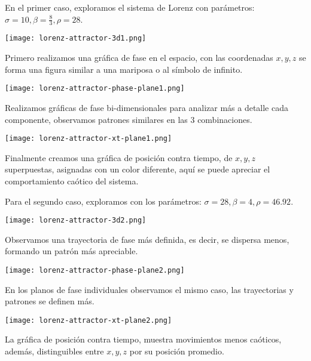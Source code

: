 \documentclass[a4paper]{article}
\begin{document}
En el primer caso, exploramos el sistema de Lorenz con parámetros: $\sigma = 10, \beta = \frac{8}{3}, \rho = 28$.

\begin{center}
	\texttt{[image: lorenz-attractor-3d1.png]}
\end{center}

Primero realizamos una gráfica de fase en el espacio, con las coordenadas $x, y, z$ se forma una figura similar a una mariposa o al símbolo de infinito.

\begin{center}
	\texttt{[image: lorenz-attractor-phase-plane1.png]}
\end{center}

Realizamos gráficas de fase bi-dimensionales para analizar más a detalle cada componente, observamos patrones similares en las 3 combinaciones.

\begin{center}
	\texttt{[image: lorenz-attractor-xt-plane1.png]}
\end{center}

Finalmente creamos una gráfica de posición contra tiempo, de $x, y, z$ superpuestas, asignadas con un color diferente, aquí se puede apreciar el comportamiento caótico del sistema.

\vspace{0.75cm}

Para el segundo caso, exploramos con los parámetros: $\sigma = 28, \beta = 4, \rho = 46.92$.

\begin{center}
	\texttt{[image: lorenz-attractor-3d2.png]}
\end{center}

Observamos una trayectoria de fase más definida, es decir, se dispersa menos, formando un patrón más apreciable.

\begin{center}
	\texttt{[image: lorenz-attractor-phase-plane2.png]}
\end{center}

En los planos de fase individuales observamos el mismo caso, las trayectorias y patrones se definen más.

\begin{center}
	\texttt{[image: lorenz-attractor-xt-plane2.png]}
\end{center}

La gráfica de posición contra tiempo, muestra movimientos menos caóticos, además, distinguibles entre $x, y, z$ por su posición promedio.
\end{document}
